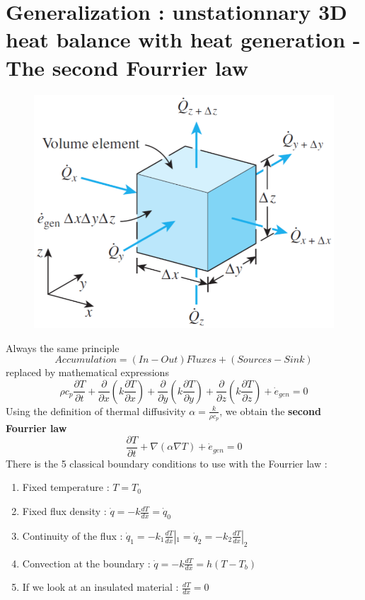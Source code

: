 \section{Generalization : unstationnary 3D heat balance with heat generation - The second Fourrier law}
	\begin{figure}
	\vspace{-10mm}
	\includegraphics[scale=0.4]{ch3/13}
	\end{figure}	
	Always the same principle
	\begin{equation}
		Accumulation = (In - Out) Fluxes + (Sources - Sink)
	\end{equation}		
	replaced by mathematical expressions
	\begin{equation}
		\rho c_p\frac{\partial T}{\partial t} + \frac{\partial}{\partial x} \left( k \frac{\partial T}{\partial x} \right) + \frac{\partial}{\partial y} \left( k \frac{\partial T}{\partial y} \right) + \frac{\partial}{\partial z} \left( k \frac{\partial T}{\partial z} \right) + \dot{e}_{gen} = 0
	\end{equation}
	Using the definition of thermal diffusivity $\alpha = \frac{k}{\rho c_p}$, we obtain the \textbf{second Fourrier law}
	\begin{equation}
		\frac{\partial T}{\partial t} + \nabla (\alpha \nabla T) + \dot{e}_{gen} = 0 
	\end{equation}
	There is the 5 classical boundary conditions to use with the Fourrier law : 
	\begin{enumerate}
		\item Fixed temperature : $T = T_0$
		\item Fixed flux density : $\dot{q} = -k \frac{dT}{dx} = \dot{q}_0$
		\item Continuity of the flux : $\dot{q}_1 = -k_1\frac{dT}{dx}|_1 = \dot{q}_2 = -k_2\frac{dT}{dx}|_2$
		\item Convection at the boundary : $\dot{q} = -k\frac{dT}{dx} = h(T-T_b)$
		\item If we look at an insulated material : $\frac{dT}{dx} = 0 $
	\end{enumerate}
	
	